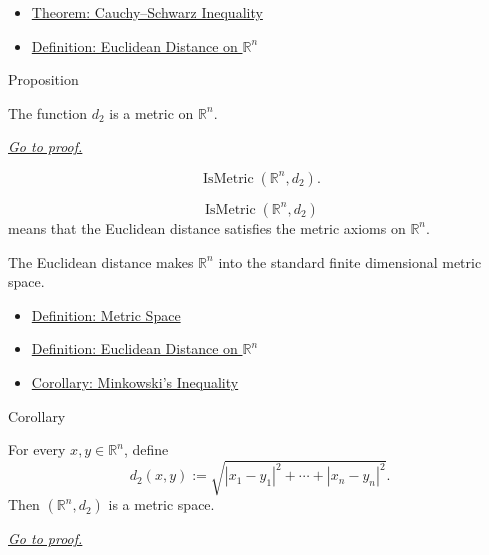 \begin{dependencies}
\begin{itemize}
  \item \hyperref[thm:cauchy-schwarz-inequality]{Theorem: Cauchy--Schwarz Inequality}
  \item \hyperref[def:euclidean-distance-rn]{Definition: Euclidean Distance on \(\mathbb{R}^n\)}
\end{itemize}
\end{dependencies}

\begin{propositionbox}{Proposition}
\begin{proposition}
\label{prop:euclidean-distance-rn-metric}
The function \(d_2\) is a metric on \(\mathbb{R}^n\).

\smallskip
\noindent
\hyperref[prf:euclidean-distance-rn-metric]{\textit{Go to proof.}}
\end{proposition}
\end{propositionbox}

\begin{remark*}
\[
  \operatorname{IsMetric}(\mathbb{R}^n,d_2).
\]
\end{remark*}

\begin{remark*}
\[
\operatorname{IsMetric}(\mathbb{R}^n,d_2)
\]
means that the Euclidean distance satisfies the metric axioms on
\(\mathbb{R}^n\).
\end{remark*}

\begin{remark*}[Interpretation]
The Euclidean distance makes \(\mathbb{R}^n\) into the standard finite
dimensional metric space.
\end{remark*}

\begin{dependencies}
\begin{itemize}
  \item \hyperref[def:metric-space]{Definition: Metric Space}
  \item \hyperref[def:euclidean-distance-rn]{Definition: Euclidean Distance on \(\mathbb{R}^n\)}
  \item \hyperref[cor:minkowski-inequality-rn]{Corollary: Minkowski's Inequality}
\end{itemize}
\end{dependencies}

\begin{corollarybox}{Corollary}
\begin{corollary}\label{cor:euclidean-metric}
For every \(x,y\in\mathbb{R}^n\), define
\[
  d_2(x,y):=\sqrt{|x_1-y_1|^2+\cdots+|x_n-y_n|^2}.
\]
Then \((\mathbb{R}^n,d_2)\) is a metric space.

\smallskip
\noindent
\hyperref[prf:euclidean-metric]{\textit{Go to proof.}}
\end{corollary}
\end{corollarybox}

